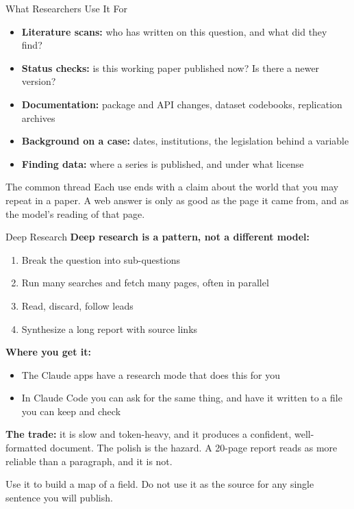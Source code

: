 \documentclass[aspectratio=169, 11pt]{beamer}
\begin{document}
\begin{frame}{What Researchers Use It For}
  \begin{itemize}
    \item \textbf{Literature scans:} who has written on this question, and what did they find?
    \item \textbf{Status checks:} is this working paper published now? Is there a newer version?
    \item \textbf{Documentation:} package and API changes, dataset codebooks, replication archives
    \item \textbf{Background on a case:} dates, institutions, the legislation behind a variable
    \item \textbf{Finding data:} where a series is published, and under what license
  \end{itemize}

  \vspace{0.8em}
  \begin{block}{The common thread}
    Each use ends with a claim about the world that you may repeat in a paper. A web answer is only as good as the page it came from, and as the model's reading of that page.
  \end{block}
\end{frame}

\begin{frame}{Deep Research}
  \textbf{Deep research is a pattern, not a different model:}
  \begin{enumerate}
    \item Break the question into sub-questions
    \item Run many searches and fetch many pages, often in parallel
    \item Read, discard, follow leads
    \item Synthesize a long report with source links
  \end{enumerate}

  \vspace{0.6em}
  \textbf{Where you get it:}
  \begin{itemize}\small
    \item The Claude apps have a research mode that does this for you
    \item In Claude Code you can ask for the same thing, and have it written to a file you can keep and check
  \end{itemize}

  \vspace{0.6em}
  \textbf{The trade:} it is slow and token-heavy, and it produces a confident, well-formatted document. The polish is the hazard. A 20-page report reads as more reliable than a paragraph, and it is not.

  \vspace{0.4em}
  \alert{Use it to build a map of a field. Do not use it as the source for any single sentence you will publish.}
\end{frame}
\end{document}
